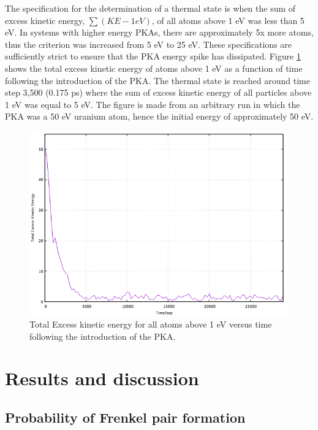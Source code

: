 \documentclass[8pt]{article}   	%
\begin{document}
The specification for the determination of a thermal state is when the sum of excess kinetic energy, $\sum (KE-1 eV)$, of all atoms above 1 eV was less than 5 eV. In systems with higher energy PKAs, there are approximately 5x more atoms, thus the criterion was increased from 5 eV to 25 eV. These specifications are sufficiently strict to ensure that the PKA energy spike has dissipated. Figure \ref{fig:KE} shows the total excess kinetic energy of atoms above 1 eV as a function of time following the introduction of the PKA. The thermal state is reached around time step 3,500 (0.175 ps) where the sum of excess kinetic energy of all particles above 1 eV was equal to 5 eV. The figure is made from an arbitrary run in which the PKA was a 50 eV uranium atom, hence the initial energy of approximately 50 eV. 

\begin{figure}[H]
\centering
	\includegraphics[width=0.6\linewidth]{ETN.png}
	\caption{Total Excess kinetic energy for all atoms above 1 eV versus time following the introduction of the PKA.}
	\label{fig:KE}
\end{figure}

\section{Results and discussion}

\subsection{Probability of Frenkel pair formation}

\hspace{5mm}
\end{document}
